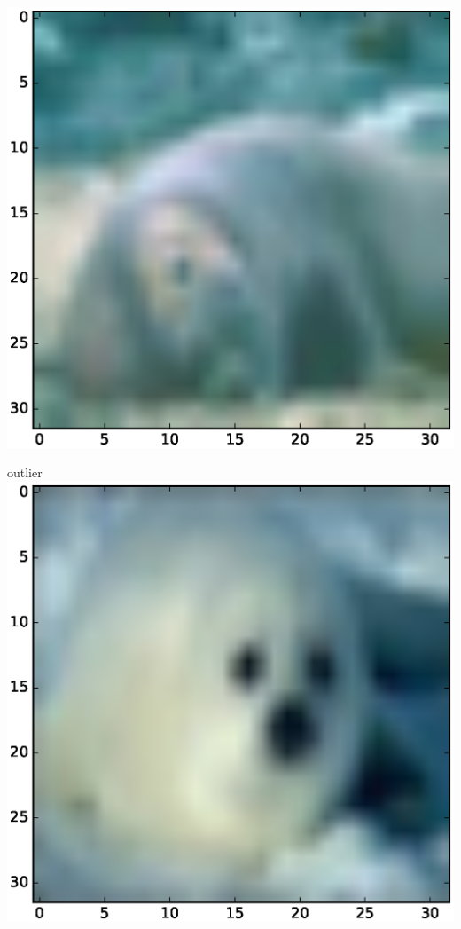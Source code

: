\documentclass{article}
\begin{document}
\includegraphics[scale=.1]{fig/c12.eps}

outlier
\includegraphics[scale=.1]{fig/c7.eps}
\end{document}
